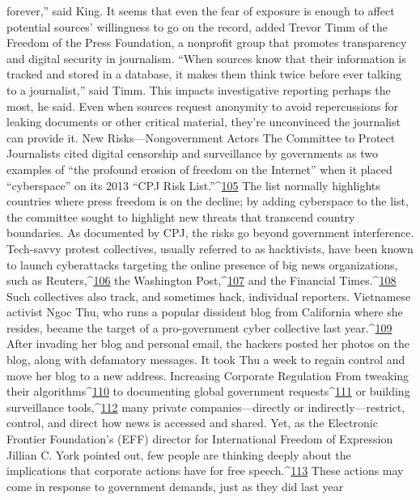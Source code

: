 forever,'' said King.
It seems that even the fear of exposure is enough to affect potential sources’ willingness
to go on the record, added Trevor Timm of the Freedom of the Press Foundation, a
nonprofit group that promotes transparency and digital security in journalism. ``When
sources know that their information is tracked and stored in a database, it makes them
think twice before ever talking to a journalist,'' said Timm. This impacts investigative
reporting perhaps the most, he said. Even when sources request anonymity to avoid
repercussions for leaking documents or other critical material, they’re unconvinced the
journalist can provide it.
New Risks—Nongovernment Actors
The Committee to Protect Journalists cited digital censorship and surveillance by
governments as two examples of ``the profound erosion of freedom on the Internet'' when
it placed ``cyberspace'' on its 2013 ``CPJ Risk List.''^{\href{#endnotes}{105}} The list normally highlights
countries where press freedom is on the decline; by adding cyberspace to the list, the
committee sought to highlight new threats that transcend country boundaries.
As documented by CPJ, the risks go beyond government interference. Tech-savvy protest
collectives, usually referred to as hacktivists, have been known to launch cyberattacks
targeting the online presence of big news organizations, such as Reuters,^{\href{#endnotes}{106}} the
Washington Post,^{\href{#endnotes}{107}} and the Financial Times.^{\href{#endnotes}{108}} Such collectives also track, and
sometimes hack, individual reporters. Vietnamese activist Ngoc Thu, who runs a popular
dissident blog from California where she resides, became the target of a pro-government
cyber collective last year.^{\href{#endnotes}{109}} After invading her blog and personal email, the hackers
posted her photos on the blog, along with defamatory messages. It took Thu a week to
regain control and move her blog to a new address.
Increasing Corporate Regulation
From tweaking their algorithms^{\href{#endnotes}{110}} to documenting global government requests^{\href{#endnotes}{111}} or
building surveillance tools,^{\href{#endnotes}{112}} many private companies—directly or indirectly—restrict,
control, and direct how news is accessed and shared. Yet, as the Electronic Frontier
Foundation’s (EFF) director for International Freedom of Expression Jillian C. York
pointed out, few people are thinking deeply about the implications that corporate actions
have for free speech.^{\href{#endnotes}{113}}
These actions may come in response to government demands, just as they did last year
